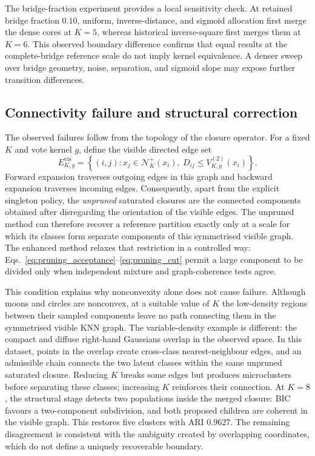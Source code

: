 \documentclass[pdflatex,sn-mathphys-num]{sn-jnl}
\newcommand{\calN}{\mathcal{N}}
\begin{document}
The bridge-fraction experiment provides a local sensitivity check. At retained bridge
fraction $0.10$, uniform, inverse-distance, and sigmoid allocation first merge
the dense cores at $K=5$, whereas historical inverse-square first merges them
at $K=6$.  This observed boundary difference confirms that equal results at
the complete-bridge reference scale do not imply kernel equivalence.  A denser
sweep over bridge geometry, noise, separation, and sigmoid slope may expose
further transition differences.

\subsection{Connectivity failure and structural correction}

The observed failures follow from the topology of the closure operator.  For a
fixed $K$ and vote kernel $g$, define the visible directed edge set
\begin{equation}
E^{\mathrm{vis}}_{K,g}=\left\{(i,j):
x_j\in\calN_K^+(x_i),\ D_{ij}\leq V_{K,g}^{(2)}(x_i)\right\}.
\label{eq:visible_edge_set}
\end{equation}
Forward expansion traverses outgoing edges in this graph and backward
expansion traverses incoming edges.  Consequently, apart from the explicit
singleton policy, the \emph{unpruned} saturated closures are the connected
components obtained after disregarding the orientation of the visible edges.
The unpruned method can therefore recover a reference partition exactly only at a
scale for which its classes form separate components of this symmetrised
visible graph.  The enhanced method relaxes that restriction in a controlled
way: Eqs.~\eqref{eq:pruning_acceptance}--\eqref{eq:pruning_cut} permit a large
component to be divided only when independent mixture and graph-coherence
tests agree.

This condition explains why nonconvexity alone does not cause failure. Although
moons and circles are nonconvex, at a suitable value of $K$ the low-density
regions between their sampled components leave no path connecting them in the
symmetrised visible KNN graph. The variable-density example is different: the
compact and diffuse right-hand Gaussians overlap in the observed space. In this
dataset, points in the overlap create cross-class nearest-neighbour edges, and
an admissible chain connects the two latent classes within the same unpruned
saturated closure. Reducing $K$ breaks some edges but produces microclusters
before separating these classes; increasing $K$ reinforces their connection.
At $K=8$, the structural stage detects two populations inside the merged
closure: BIC favours a two-component subdivision, and both proposed children
are coherent in the visible graph. This restores five clusters with ARI
$0.9627$. The remaining disagreement is consistent with the ambiguity created
by overlapping coordinates, which do not define a uniquely recoverable
boundary.
\end{document}
